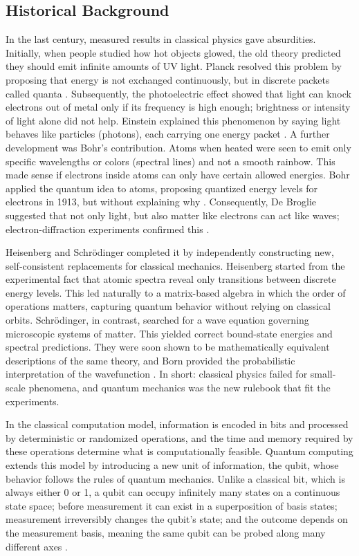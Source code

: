 \documentclass[12pt,a4paper,openany]{report}
\let\parencite\citep
\begin{document}
\subsection{Historical Background}
In the last century, measured results in classical physics gave absurdities. Initially, when people studied how hot objects glowed, the old theory predicted they should emit infinite amounts of UV light. Planck resolved this problem by proposing that energy is not exchanged continuously, but in discrete packets called quanta \parencite{planck_1900_blackbody}. Subsequently, the photoelectric effect showed that light can knock electrons out of metal only if its frequency is high enough; brightness or intensity of light alone did not help. Einstein explained this phenomenon by saying light behaves like particles (photons), each carrying one energy packet \parencite{einstein_1905_photoelectric}. A further development was Bohr's contribution. Atoms when heated were seen to emit only specific wavelengths or colors (spectral lines) and not a smooth rainbow. This made sense if electrons inside atoms can only have certain allowed energies. Bohr applied the quantum idea to atoms, proposing quantized energy levels for electrons in 1913, but without explaining why \parencite{bohr_1913_atom}. Consequently, De Broglie suggested that not only light, but also matter like electrons can act like waves; electron-diffraction experiments confirmed this \parencite{debroglie_1924_thesis}.

Heisenberg and Schr{\"o}dinger completed it by independently constructing new, self-consistent replacements for classical mechanics. Heisenberg started from the experimental fact that atomic spectra reveal only transitions between discrete energy levels. This led naturally to a matrix-based algebra in which the order of operations matters, capturing quantum behavior without relying on classical orbits. Schr{\"o}dinger, in contrast, searched for a wave equation governing microscopic systems of matter. This yielded correct bound-state energies and spectral predictions. They were soon shown to be mathematically equivalent descriptions of the same theory, and Born provided the probabilistic interpretation of the wavefunction \parencite{heisenberg_1925_matrix_mechanics,schrodinger_1926_wave_mechanics,born_1926_born_rule}. In short: classical physics failed for small-scale phenomena, and quantum mechanics was the new rulebook that fit the experiments.

In the classical computation model, information is encoded in bits and processed by deterministic or randomized operations, and the time and memory required by these operations determine what is computationally feasible. Quantum computing extends this model by introducing a new unit of information, the qubit, whose behavior follows the rules of quantum mechanics. Unlike a classical bit, which is always either 0 or 1, a qubit can occupy infinitely many states on a continuous state space; before measurement it can exist in a superposition of basis states; measurement irreversibly changes the qubit's state; and the outcome depends on the measurement basis, meaning the same qubit can be probed along many different axes \parencite{nielsen_chuang_qcqi}.
\end{document}
